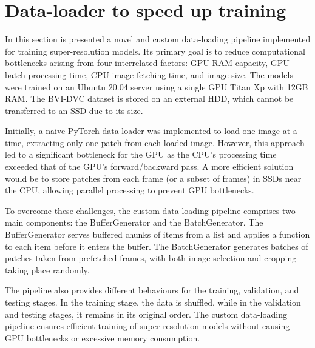 \section{Data-loader to speed up training}
\label{sec:dataloader}

In this section is presented a novel and custom data-loading pipeline implemented for training super-resolution models. Its primary goal is to reduce computational bottlenecks arising from four interrelated factors: GPU RAM capacity, GPU batch processing time, CPU image fetching time, and image size. The models were trained on an Ubuntu 20.04 server using a single GPU Titan Xp with 12GB RAM. The BVI-DVC dataset is stored on an external HDD, which cannot be transferred to an SSD due to its size.

Initially, a naive PyTorch data loader was implemented to load one image at a time, extracting only one patch from each loaded image. However, this approach led to a significant bottleneck for the GPU as the CPU's processing time exceeded that of the GPU's forward/backward pass. A more efficient solution would be to store patches from each frame (or a subset of frames) in SSDs near the CPU, allowing parallel processing to prevent GPU bottlenecks.

To overcome these challenges, the custom data-loading pipeline comprises two main components: the BufferGenerator and the BatchGenerator. The BufferGenerator serves buffered chunks of items from a list and applies a function to each item before it enters the buffer. The BatchGenerator generates batches of patches taken from prefetched frames, with both image selection and cropping taking place randomly.

The pipeline also provides different behaviours for the training, validation, and testing stages. In the training stage, the data is shuffled, while in the validation and testing stages, it remains in its original order. The custom data-loading pipeline ensures efficient training of super-resolution models without causing GPU bottlenecks or excessive memory consumption.

